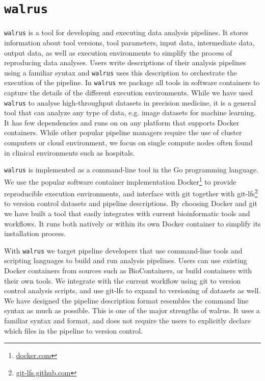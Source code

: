 \section{\texttt{walrus}} 
\texttt{walrus} is a tool for developing and executing data analysis pipelines.
It stores information about tool versions, tool parameters, input data,
intermediate data, output data, as well as execution environments to simplify
the process of reproducing data analyses. Users write descriptions of their
analysis pipelines using a familiar syntax and \texttt{walrus}  uses this
description to orchestrate the execution of the pipeline. In \texttt{walrus}  we
package all tools in software containers to capture the details of the different
execution environments. While we have used \texttt{walrus}  to analyse
high-throughput datasets in precision medicine, it is a general tool that can
analyze any type of data, e.g. image datasets for machine learning. It has few
dependencies and runs on on any platform that supports Docker containers. While
other popular pipeline managers require the use of cluster computers or cloud
environment, we focus on single compute nodes often found in clinical
environments such as hospitals. 

\texttt{walrus}  is implemented as a command-line tool in the Go programming
language. We use the popular software container implementation
Docker\footnote{\url{docker.com}} to provide reproducible execution
environments, and interface with git together with
git-lfs\footnote{\url{git-lfs.github.com}} to version control datasets and
pipeline descriptions. By choosing Docker and git we have built a tool that
easily integrates with current bioinformatic tools and workflows. It runs both
natively or within its own Docker container to simplify its installation
process.

With \texttt{walrus} we target pipeline developers that use command-line tools
and scripting languages to build and run analysis pipelines. Users can use
existing Docker containers from sources such as
BioContainers,\cite{biocontainers} or build containers with their own tools.  We
integrate with the current workflow using git to version control analysis
scripts, and use git-lfs to expand to versioning of datasets as well. We have
designed the pipeline description format resembles the command line syntax as
much as possible. This is one of the major strengths of walrus. It uses a
familiar syntax and format, and does not require the users to explicitly
declare which files in the pipeline to version control. 


